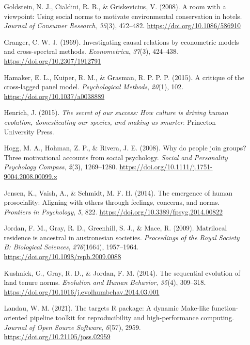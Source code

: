 \documentclass[
  english,
  man,floatsintext]{apa6}
\newlength{\cslhangindent}
\newlength{\cslentryspacingunit} %
\newenvironment{CSLReferences}[2] %
 {%
  \setlength{\parindent}{0pt}
  \ifodd #1
  \let\oldpar\par
  \def\par{\hangindent=\cslhangindent\oldpar}
  \fi
  \setlength{\parskip}{#2\cslentryspacingunit}
 }%
 {}
\begin{document}
\begin{CSLReferences}{1}{0}
\leavevmode{}%
Goldstein, N. J., Cialdini, R. B., \& Griskevicius, V. (2008). A room with a viewpoint: Using social norms to motivate environmental conservation in hotels. \emph{Journal of Consumer Research}, \emph{35}(3), 472--482. \url{https://doi.org/10.1086/586910}

\leavevmode{}%
Granger, C. W. J. (1969). Investigating causal relations by econometric models and cross-spectral methods. \emph{Econometrica}, \emph{37}(3), 424--438. \url{https://doi.org/10.2307/1912791}

\leavevmode{}%
Hamaker, E. L., Kuiper, R. M., \& Grasman, R. P. P. P. (2015). A critique of the cross-lagged panel model. \emph{Psychological Methods}, \emph{20}(1), 102. \url{https://doi.org/10.1037/a0038889}

\leavevmode{}%
Henrich, J. (2015). \emph{The secret of our success: How culture is driving human evolution, domesticating our species, and making us smarter}. Princeton University Press.

\leavevmode{}%
Hogg, M. A., Hohman, Z. P., \& Rivera, J. E. (2008). Why do people join groups? Three motivational accounts from social psychology. \emph{Social and Personality Psychology Compass}, \emph{2}(3), 1269--1280. \url{https://doi.org/10.1111/j.1751-9004.2008.00099.x}

\leavevmode{}%
Jensen, K., Vaish, A., \& Schmidt, M. F. H. (2014). The emergence of human prosociality: Aligning with others through feelings, concerns, and norms. \emph{Frontiers in Psychology}, \emph{5}, 822. \url{https://doi.org/10.3389/fpsyg.2014.00822}

\leavevmode{}%
Jordan, F. M., Gray, R. D., Greenhill, S. J., \& Mace, R. (2009). Matrilocal residence is ancestral in austronesian societies. \emph{Proceedings of the Royal Society B: Biological Sciences}, \emph{276}(1664), 1957--1964. \url{https://doi.org/10.1098/rspb.2009.0088}

\leavevmode{}%
Kushnick, G., Gray, R. D., \& Jordan, F. M. (2014). The sequential evolution of land tenure norms. \emph{Evolution and Human Behavior}, \emph{35}(4), 309--318. \url{https://doi.org/10.1016/j.evolhumbehav.2014.03.001}

\leavevmode{}%
Landau, W. M. (2021). The targets {R} package: A dynamic {M}ake-like function-oriented pipeline toolkit for reproducibility and high-performance computing. \emph{Journal of Open Source Software}, \emph{6}(57), 2959. \url{https://doi.org/10.21105/joss.02959}


\end{CSLReferences}
\end{document}
